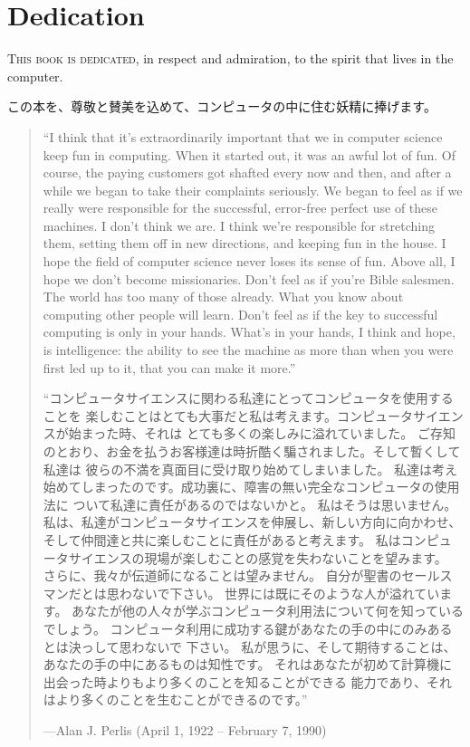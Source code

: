 \documentclass[oneside]{book}
\begin{document}

\label{Dedication}
\chapter*{Dedication}

\lettrine{T}{his book is dedicated}, in respect and admiration, to the spirit that lives in
the computer.

この本を、尊敬と賛美を込めて、コンピュータの中に住む妖精に捧げます。

\begin{quote}
``I think that it's extraordinarily important that we in computer science keep
fun in computing.  When it started out, it was an awful lot of fun. Of course,
the paying customers got shafted every now and then, and after a while we began
to take their complaints seriously.  We began to feel as if we really were
responsible for the successful, error-free perfect use of these machines. 
I don't think we are.  I think we're responsible for stretching them, setting
them off in new directions, and keeping fun in the house.  I hope the field of
computer science never loses its sense of fun.  Above all, I hope we don't
become missionaries.  Don't feel as if you're Bible salesmen.   The world has
too many of those already.  What you know about computing other people will
learn. Don't feel as if the key to successful computing is only in your hands.
What's in your hands, I think and hope, is intelligence: the ability to see the
machine as more than when you were first led up to it, that you can make it
more.''

``コンピュータサイエンスに関わる私達にとってコンピュータを使用することを
楽しむことはとても大事だと私は考えます。コンピュータサイエンスが始まった時、それは
とても多くの楽しみに溢れていました。
ご存知のとおり、お金を払うお客様達は時折酷く騙されました。そして暫くして私達は
彼らの不満を真面目に受け取り始めてしまいました。
私達は考え始めてしまったのです。成功裏に、障害の無い完全なコンピュータの使用法に
ついて私達に責任があるのではないかと。
私はそうは思いません。
私は、私達がコンピュータサイエンスを伸展し、新しい方向に向かわせ、
そして仲間達と共に楽しむことに責任があると考えます。
私はコンピュータサイエンスの現場が楽しむことの感覚を失わないことを望みます。
さらに、我々が伝道師になることは望みません。
自分が聖書のセールスマンだとは思わないで下さい。
世界には既にそのような人が溢れています。
あなたが他の人々が学ぶコンピュータ利用法について何を知っているでしょう。
コンピュータ利用に成功する鍵があなたの手の中にのみあるとは決っして思わないで
下さい。
 私が思うに、そして期待することは、あなたの手の中にあるものは知性です。
それはあなたが初めて計算機に出会った時よりもより多くのことを知ることができる
能力であり、それはより多くのことを生むことができるのです。''

\noindent
---Alan J. Perlis (April 1, 1922 -- February 7, 1990)
\end{quote}
\end{document}

